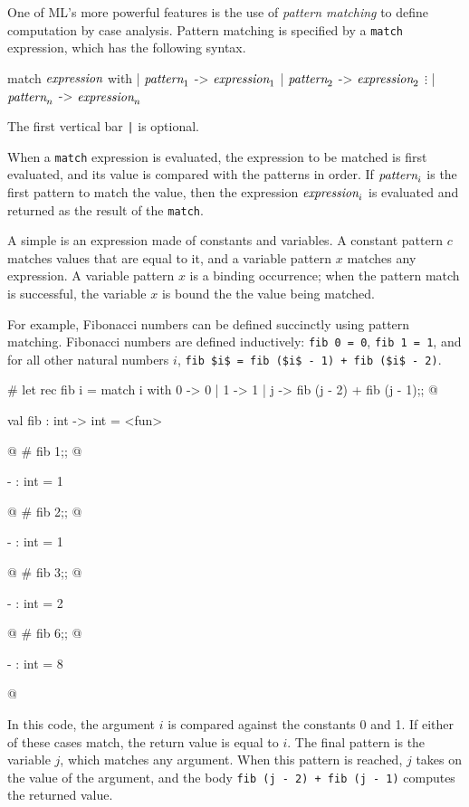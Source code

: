 
One of ML's more powerful features is the use of \emph{pattern
matching} to define computation by case analysis.  Pattern matching is
specified by a \hbox{\lstinline/match/} expression, which has the following
syntax.

\label{keyword:|}
\label{keyword:match}
\label{keyword:with}
\begin{ocaml}
match $\textit{\rmfamily expression}$ with
 | $\textit{\rmfamily pattern}_1$ -> $\textit{\rmfamily expression}_1$
 | $\textit{\rmfamily pattern}_2$ -> $\textit{\rmfamily expression}_2$
 $\vdots$
 | $\textit{\rmfamily pattern}_n$ -> $\textit{\rmfamily expression}_n$
\end{ocaml}
%
The first vertical bar \hbox{\lstinline/|/} is optional.

When a \hbox{\lstinline/match/} expression is evaluated, the expression
 to be matched is first evaluated, and its value is
compared with the patterns in order.  If $\emph{pattern}_i$ is the
first pattern to match the value, then the expression
$\emph{expression}_i$ is evaluated and returned as the result of the
\hbox{\lstinline/match/}.

A simple  is an expression made of constants and
variables.  A constant pattern $c$ matches values that are equal to
it, and a variable pattern $x$ matches any expression.  A variable
pattern $x$ is a binding occurrence; when the pattern match is
successful, the variable $x$ is bound the the value being matched.

For example, Fibonacci numbers can be defined succinctly using pattern
matching.  Fibonacci numbers are defined inductively:
\hbox{\lstinline/fib 0 = 0/},
\hbox{\lstinline/fib 1 = 1/},
and for all other natural numbers $i$,
\hbox{\lstinline/fib $i$ = fib ($i$ - 1) + fib ($i$ - 2)/}.

\begin{ocaml}
# let rec fib i =
     match i with
        0 -> 0
      | 1 -> 1
      | j -> fib (j - 2) + fib (j - 1);;
@
\begin{topoutput}
val fib : int -> int = <fun>
\end{topoutput}
@
# fib 1;;
@
\begin{topoutput}
- : int = 1
\end{topoutput}
@
# fib 2;;
@
\begin{topoutput}
- : int = 1
\end{topoutput}
@
# fib 3;;
@
\begin{topoutput}
- : int = 2
\end{topoutput}
@
# fib 6;;
@
\begin{topoutput}
- : int = 8
\end{topoutput}
@
\end{ocaml}
%
In this code, the argument $i$ is compared against the constants 0 and
1.  If either of these cases match, the return value is equal to $i$.  The final
pattern is the variable $j$, which matches any argument.  When this
pattern is reached, $j$ takes on the value of the argument, and the
body \hbox{\lstinline/fib (j - 2) + fib (j - 1)/} computes the returned value.

